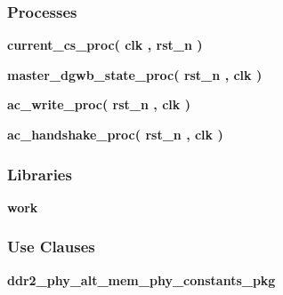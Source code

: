 \subsubsection*{Processes}
 \begin{DoxyCompactItemize}
\item 
{\bf current\+\_\+cs\+\_\+proc}{\bfseries  ( {\bfseries {\bfseries {\bf clk}} \textcolor{vhdlchar}{ }} , {\bfseries {\bfseries {\bf rst\+\_\+n}} \textcolor{vhdlchar}{ }} )}
\item 
{\bf master\+\_\+dgwb\+\_\+state\+\_\+proc}{\bfseries  ( {\bfseries {\bfseries {\bf rst\+\_\+n}} \textcolor{vhdlchar}{ }} , {\bfseries {\bfseries {\bf clk}} \textcolor{vhdlchar}{ }} )}
\item 
{\bf ac\+\_\+write\+\_\+proc}{\bfseries  ( {\bfseries {\bfseries {\bf rst\+\_\+n}} \textcolor{vhdlchar}{ }} , {\bfseries {\bfseries {\bf clk}} \textcolor{vhdlchar}{ }} )}
\item 
{\bf ac\+\_\+handshake\+\_\+proc}{\bfseries  ( {\bfseries {\bfseries {\bf rst\+\_\+n}} \textcolor{vhdlchar}{ }} , {\bfseries {\bfseries {\bf clk}} \textcolor{vhdlchar}{ }} )}
\end{DoxyCompactItemize}
\subsubsection*{Libraries}
 \begin{DoxyCompactItemize}
\item 
{\bf work} 
\end{DoxyCompactItemize}
\subsubsection*{Use Clauses}
 \begin{DoxyCompactItemize}
\item 
{\bf ddr2\+\_\+phy\+\_\+alt\+\_\+mem\+\_\+phy\+\_\+constants\+\_\+pkg}   
\end{DoxyCompactItemize}
